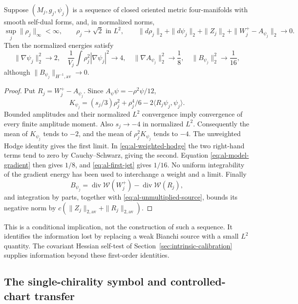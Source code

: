 \begin{corollary}
\label{cor:al-surviving-energy}
Suppose $(M_j,g_j,\psi_j)$ is a sequence of closed oriented metric
four-manifolds with smooth self-dual forms, and, in normalized norms,
\[
 \sup_j\|\rho_j\|_\infty<\infty,\qquad
 \rho_j\longrightarrow\sqrt2\text{ in }L^2,\qquad
 \|d\rho_j\|_2+\|d\psi_j\|_2+\|Z_j\|_2
       +\|W^+_j-A_{\psi_j}\|_2\longrightarrow0.
\]
Then the normalized energies satisfy
\[
 \|\nabla\psi_j\|_2^2\longrightarrow2,\quad
 \frac1{V_j}\int\rho_j^2|\nabla\psi_j|^2\longrightarrow4,
 \quad \|\nabla A_{\psi_j}\|_2^2\longrightarrow\frac18,
 \quad \|B_{\psi_j}\|_2^2\longrightarrow\frac1{16},
\]
although $\|B_{\psi_j}\|_{H^{-1},\mathrm{av}}\to0$.
\end{corollary}

\begin{proof}
Put $R_j=W^+_j-A_{\psi_j}$.  Since
$A_\psi\psi=-\rho^2\psi/12$,
\[
 K_{\psi_j}=(s_j/3)\rho_j^2+\rho_j^4/6
                   -2\langle R_j\psi_j,\psi_j\rangle.
\]
Bounded amplitudes and their normalized $L^2$ convergence imply convergence
of every finite amplitude moment.  Also $s_j\to-4$ in normalized $L^2$.
Consequently the mean of $K_{\psi_j}$ tends to $-2$, and the mean of
$\rho_j^2K_{\psi_j}$ tends to $-4$.  The unweighted Hodge identity gives
the first limit.  In \eqref{eq:al-weighted-hodge} the two right-hand terms
tend to zero by Cauchy--Schwarz, giving the second.  Equation
\eqref{eq:al-model-gradient} then gives $1/8$, and
\eqref{eq:al-first-jet} gives $1/16$.  No uniform integrability of the
gradient energy has been used to interchange a weight and a limit.
Finally
\[
 B_{\psi_j}=\operatorname{div}\mathcal W(W^+_j)
             -\operatorname{div}\mathcal W(R_j),
\]
and integration by parts, together with
\eqref{eq:al-unmultiplied-source}, bounds its negative norm by
$c(\|Z_j\|_{2,\mathrm{av}}+\|R_j\|_{2,\mathrm{av}})$.
\end{proof}

This is a conditional implication, not the construction of such a
sequence.  It identifies the information lost by replacing a weak Bianchi
source with a small $L^2$ quantity.  The covariant Hessian self-test of
Section~\ref{sec:intrinsic-calibration} supplies information beyond these
first-order identities.

\subsection{The single-chirality symbol and controlled-chart transfer}

